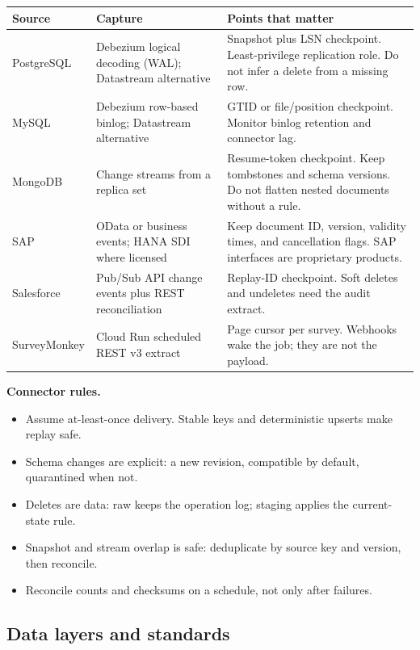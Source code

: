 \documentclass[10pt,a4paper]{article}
\begin{document}
{\small
\begin{tabularx}{\textwidth}{L{22mm}L{56mm}Y}
\toprule
\textbf{Source} & \textbf{Capture} & \textbf{Points that matter} \\
\midrule
PostgreSQL & Debezium logical decoding (WAL); Datastream alternative & Snapshot plus LSN checkpoint. Least-privilege replication role. Do not infer a delete from a missing row. \\
MySQL & Debezium row-based binlog; Datastream alternative & GTID or file/position checkpoint. Monitor binlog retention and connector lag. \\
MongoDB & Change streams from a replica set & Resume-token checkpoint. Keep tombstones and schema versions. Do not flatten nested documents without a rule. \\
SAP & OData or business events; HANA SDI where licensed & Keep document ID, version, validity times, and cancellation flags. SAP interfaces are proprietary products.\cite{sapEvents,sapSDI} \\
Salesforce & Pub/Sub API change events plus REST reconciliation & Replay-ID checkpoint. Soft deletes and undeletes need the audit extract.\cite{sfPubSub} \\
SurveyMonkey & Cloud Run scheduled REST v3 extract & Page cursor per survey. Webhooks wake the job; they are not the payload.\cite{smAPI} \\
\bottomrule
\end{tabularx}
}

\textbf{Connector rules.}
\begin{itemize}
  \item Assume at-least-once delivery. Stable keys and deterministic upserts make replay safe.
  \item Schema changes are explicit: a new revision, compatible by default, quarantined when not.
  \item Deletes are data: raw keeps the operation log; staging applies the current-state rule.
  \item Snapshot and stream overlap is safe: deduplicate by source key and version, then reconcile.
  \item Reconcile counts and checksums on a schedule, not only after failures.
\end{itemize}

\subsection{Data layers and standards}
\end{document}
